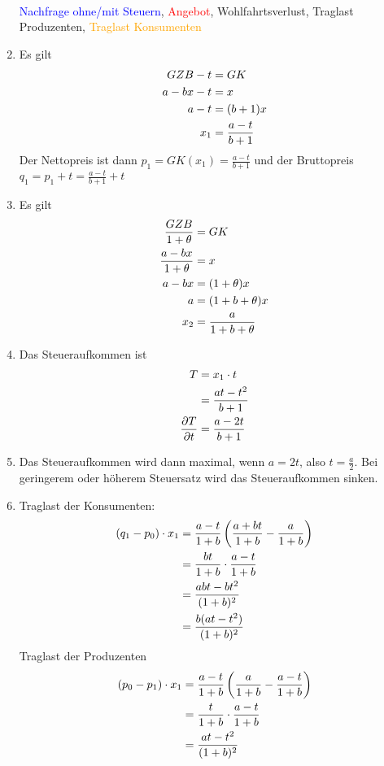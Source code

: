 \documentclass{article}
\begin{document}
\begin{enumerate}[label=(\alph*)]
\begin{center}
\begin{tikzpicture}
			\end{tikzpicture} \\
			\textcolor{blue}{Nachfrage ohne/mit Steuern}, \textcolor{red}{Angebot}, \textcolor{green!80!black}{Wohlfahrtsverlust}, \textcolor{yellow!90!black}{Traglast Produzenten}, \textcolor{orange}{Traglast Konsumenten}
		\end{center}
		\item Es gilt
		\begin{align}
			GZB - t &= GK \notag \\
			a-bx - t &= x \notag \\
			a-t &= (b+1)x \notag \\
			x_1 &= \frac{a-t}{b+1} \notag
		\end{align}
		Der Nettopreis ist dann $p_1=GK(x_1)=\frac{a-t}{b+1}$ und der Bruttopreis $q_1=p_1+t= \frac{a-t}{b+1}+t$
		\item Es gilt
		\begin{align}
			\frac{GZB}{1+\theta} &= GK \notag \\
			\frac{a-bx}{1+\theta} &= x \notag \\
			a-bx &= (1+\theta)x \notag \\
			a &= (1+b+\theta)x \notag \\
			x_2 &= \frac{a}{1+b+\theta} \notag
		\end{align}
		\item Das Steueraufkommen ist
		\begin{align}
			T &= x_1\cdot t \notag \\
			&= \frac{at-t^2}{b+1} \notag \\
			\frac{\partial T}{\partial t} &= \frac{a-2t}{b+1} \notag
		\end{align}
		\item Das Steueraufkommen wird dann maximal, wenn $a=2t$, also $t=\frac{a}{2}$. Bei geringerem oder höherem Steuersatz wird das Steueraufkommen sinken.
		\item Traglast der Konsumenten:
		\begin{align}
			(q_1-p_0)\cdot x_1 &= \frac{a-t}{1+b}\left(\frac{a+bt}{1+b}-\frac{a}{1+b}\right) \notag \\
			&= \frac{bt}{1+b}\cdot\frac{a-t}{1+b} \notag \\
			&= \frac{abt - bt^2}{(1+b)^2} \notag \\
			&= \frac{b(at-t^2)}{(1+b)^2} \notag
		\end{align}
		Traglast der Produzenten
		\begin{align}
			(p_0-p_1)\cdot x_1 &= \frac{a-t}{1+b}\left(\frac{a}{1+b}-\frac{a-t}{1+b}\right) \notag \\
			&= \frac{t}{1+b}\cdot\frac{a-t}{1+b} \notag \\
			&= \frac{at-t^2}{(1+b)^2} \notag
		\end{align}
	\end{enumerate}
\end{document}
